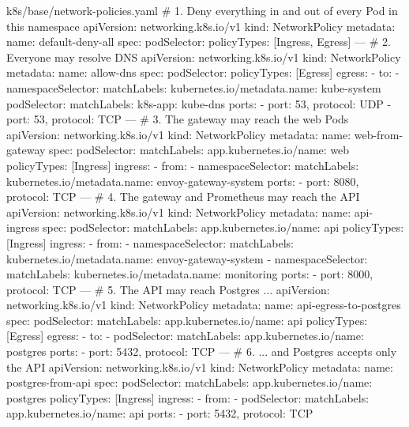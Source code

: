 \begin{yamlcode}{k8s/base/network-policies.yaml}
# 1. Deny everything in and out of every Pod in this namespace
apiVersion: networking.k8s.io/v1
kind: NetworkPolicy
metadata:
  name: default-deny-all
spec:
  podSelector: {}
  policyTypes: [Ingress, Egress]
---
# 2. Everyone may resolve DNS
apiVersion: networking.k8s.io/v1
kind: NetworkPolicy
metadata:
  name: allow-dns
spec:
  podSelector: {}
  policyTypes: [Egress]
  egress:
    - to:
        - namespaceSelector:
            matchLabels:
              kubernetes.io/metadata.name: kube-system
          podSelector:
            matchLabels:
              k8s-app: kube-dns
      ports:
        - { port: 53, protocol: UDP }
        - { port: 53, protocol: TCP }
---
# 3. The gateway may reach the web Pods
apiVersion: networking.k8s.io/v1
kind: NetworkPolicy
metadata:
  name: web-from-gateway
spec:
  podSelector:
    matchLabels:
      app.kubernetes.io/name: web
  policyTypes: [Ingress]
  ingress:
    - from:
        - namespaceSelector:
            matchLabels:
              kubernetes.io/metadata.name: envoy-gateway-system
      ports:
        - { port: 8080, protocol: TCP }
---
# 4. The gateway and Prometheus may reach the API
apiVersion: networking.k8s.io/v1
kind: NetworkPolicy
metadata:
  name: api-ingress
spec:
  podSelector:
    matchLabels:
      app.kubernetes.io/name: api
  policyTypes: [Ingress]
  ingress:
    - from:
        - namespaceSelector:
            matchLabels:
              kubernetes.io/metadata.name: envoy-gateway-system
        - namespaceSelector:
            matchLabels:
              kubernetes.io/metadata.name: monitoring
      ports:
        - { port: 8000, protocol: TCP }
---
# 5. The API may reach Postgres ...
apiVersion: networking.k8s.io/v1
kind: NetworkPolicy
metadata:
  name: api-egress-to-postgres
spec:
  podSelector:
    matchLabels:
      app.kubernetes.io/name: api
  policyTypes: [Egress]
  egress:
    - to:
        - podSelector:
            matchLabels:
              app.kubernetes.io/name: postgres
      ports:
        - { port: 5432, protocol: TCP }
---
# 6. ... and Postgres accepts only the API
apiVersion: networking.k8s.io/v1
kind: NetworkPolicy
metadata:
  name: postgres-from-api
spec:
  podSelector:
    matchLabels:
      app.kubernetes.io/name: postgres
  policyTypes: [Ingress]
  ingress:
    - from:
        - podSelector:
            matchLabels:
              app.kubernetes.io/name: api
      ports:
        - { port: 5432, protocol: TCP }
\end{yamlcode}

